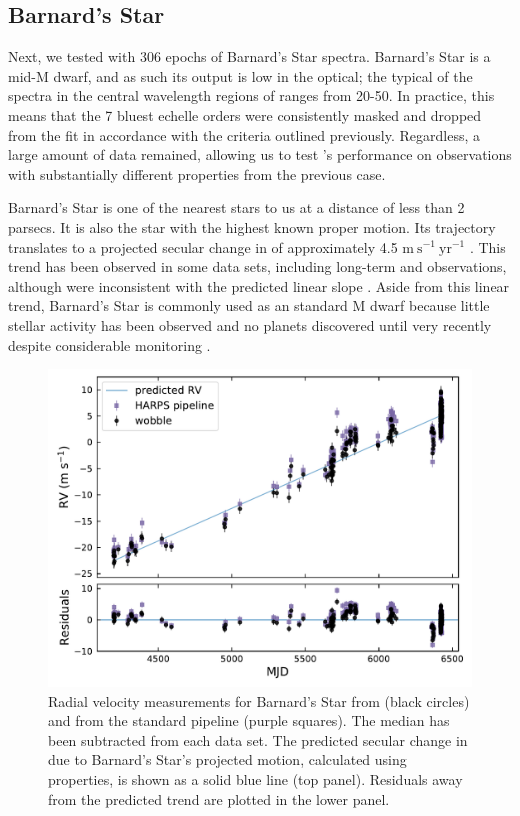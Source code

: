 \documentclass[modern]{aastex62}
\newcommand{\Mdwarf}{Barnard's Star\xspace} %
\begin{document}
\subsection{\Mdwarf}
\label{s:Mdwarf}

Next, we tested \wobble with 306 epochs of \Mdwarf spectra.
\Mdwarf is a mid-M dwarf, and as such its output is low in the optical; the typical \SNR of the spectra in the central wavelength regions of \HARPS ranges from 20-50. 
In practice, this means that the 7 bluest echelle orders were consistently masked and dropped from the fit in accordance with the \SNR criteria outlined previously. 
Regardless, a large amount of data remained, allowing us to test \wobble's performance on observations with substantially different properties from the previous case.

\Mdwarf is one of the nearest stars to us at a distance of less than 2 parsecs. 
It is also the star with the highest known proper motion. 
Its trajectory translates to a projected secular change in \RV of approximately 4.5 $\mathrm{m}~\mathrm{s}^{-1}~\mathrm{yr}^{-1}$ \citep{Kurster2003}. 
This trend has been observed in some data sets, including long-term \HARPS and  observations, although  \RVs were inconsistent with the predicted linear slope \citep{Kurster2003, Bonfils2013, Choi2013, Montet2014}. 
Aside from this linear trend, \Mdwarf is commonly used as an \RV standard M dwarf because little stellar activity has been observed and no planets discovered until very recently despite considerable \RV monitoring \citep{Ribas2018}. 

\begin{figure}
\centering
\includegraphics[width=5in]{barnards_rvs}
\caption{Radial velocity measurements for \Mdwarf from \wobble (black circles) and from the standard \HARPS pipeline (purple squares). The median \RV has been subtracted from each data set. The predicted secular change in \RV due to \Mdwarf's projected motion, calculated using \gaia properties, is shown as a solid blue line (top panel). Residuals away from the predicted trend are plotted in the lower panel.}
\label{fig:barnards_rvs}
\end{figure}
\end{document}
